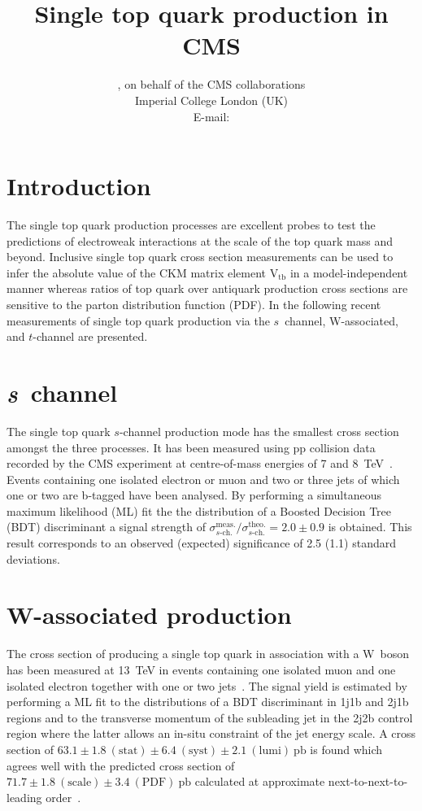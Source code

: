 \documentclass{PoS}
\title{Single top quark production in CMS}
\author{
    \speaker{Matthias Komm}, on behalf of the CMS collaborations\\
    Imperial College London (UK)\\
    E-mail: \email{Matthias.Komm@cern.ch}
}
\begin{document}
\section{Introduction}
The single top quark production processes are excellent probes to test the predictions of electroweak interactions at the scale of the top quark mass and beyond. Inclusive single top quark cross section measurements can be used to infer the absolute value of the CKM matrix element $\mathrm{V}_\mathrm{tb}$ in a model-independent manner whereas  ratios of top quark over antiquark production cross sections are sensitive to the parton distribution function (PDF). In the following recent measurements of single top quark production via the $s$~channel, W-associated, and $t$-channel are presented.

\section{\textit{s}~channel}

The single top quark $s$-channel production mode has the smallest cross section amongst the three processes. It has been measured using pp collision data recorded by the CMS experiment at centre-of-mass energies of 7 and 8~TeV~\cite{sch}. Events containing one isolated electron or muon and two or three jets of which one or two are b-tagged have been analysed. By performing a simultaneous maximum likelihood (ML) fit the the distribution of a Boosted Decision Tree (BDT) discriminant a signal strength of $\sigma^\mathrm{meas.}_{s\mbox{-}\mathrm{ch.}}/\sigma^\mathrm{theo.}_{s\mbox{-}\mathrm{ch.}}=2.0\pm0.9$ is obtained. This result corresponds to an observed (expected) significance of 2.5 (1.1) standard deviations.


\section{W-associated production}

The cross section of producing a single top quark in association with a W~boson has been measured at 13~TeV in events containing one isolated muon and one isolated electron together with one or two jets~\cite{tWch}. The signal yield is estimated by performing a ML fit to the distributions of a BDT discriminant in 1j1b and 2j1b regions and to the transverse momentum of the subleading jet in the 2j2b control region where the latter allows an in-situ constraint of the jet energy scale. A cross section of $63.1\pm1.8~\mathrm{(stat)}\pm6.4~\mathrm{(syst)}\pm2.1~\mathrm{(lumi)}~\mathrm{pb}$ is found which agrees well with the predicted cross section of $71.7\pm1.8~\mathrm{(scale)}\pm3.4~\mathrm{(PDF)}~\mathrm{pb}$ calculated at approximate next-to-next-to-leading order~\cite{tw-xsec}.
\end{document}
